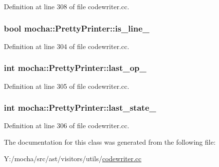 Definition at line 308 of file codewriter.cc.

\hypertarget{classmocha_1_1_pretty_printer_a8708ff8166e2017244fbb396a2688ebb}{
\subsubsection[{is\_\-line\_\-}]{\setlength{\rightskip}{0pt plus 5cm}bool {\bf mocha::PrettyPrinter::is\_\-line\_\-}}}
\label{classmocha_1_1_pretty_printer_a8708ff8166e2017244fbb396a2688ebb}


Definition at line 304 of file codewriter.cc.

\hypertarget{classmocha_1_1_pretty_printer_a146a5110df5481164c5ad84a36fffe0c}{
\subsubsection[{last\_\-op\_\-}]{\setlength{\rightskip}{0pt plus 5cm}int {\bf mocha::PrettyPrinter::last\_\-op\_\-}}}
\label{classmocha_1_1_pretty_printer_a146a5110df5481164c5ad84a36fffe0c}


Definition at line 305 of file codewriter.cc.

\hypertarget{classmocha_1_1_pretty_printer_a50d07941880d3d2fc1fdf656ced16468}{
\subsubsection[{last\_\-state\_\-}]{\setlength{\rightskip}{0pt plus 5cm}int {\bf mocha::PrettyPrinter::last\_\-state\_\-}}}
\label{classmocha_1_1_pretty_printer_a50d07941880d3d2fc1fdf656ced16468}


Definition at line 306 of file codewriter.cc.



The documentation for this class was generated from the following file:\begin{DoxyCompactItemize}
\item 
Y:/mocha/src/ast/visitors/utils/\hyperlink{codewriter_8cc}{codewriter.cc}\end{DoxyCompactItemize}
